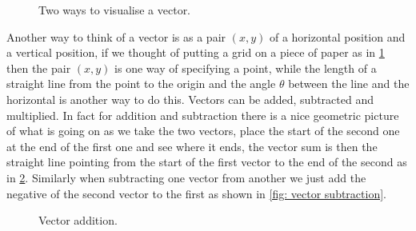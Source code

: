 \documentclass[a4paper,12pt]{book}
\begin{document}
\begin{figure}[ht]
    \centering
    \caption{Two ways to visualise a vector.}
    \label{fig: vectors}
\end{figure}

Another way to think of a vector is as a pair $(x,y)$ of a horizontal position and a vertical position, if we thought of putting a grid on a piece of paper as in \cref{fig: vectors} then the pair $(x,y)$ is one way of specifying a point, while the length of a straight line from the point to the origin and the angle $\theta$ between the line and the horizontal is another way to do this. Vectors can be added, subtracted and multiplied. In fact for addition and subtraction there is a nice geometric picture of what is going on as we take the two vectors, place the start of the second one at the end of the first one and see where it ends, the vector sum is then the straight line pointing from the start of the first vector to the end of the second as in \cref{fig: vector addition}. Similarly when subtracting one vector from another we just add the negative of the second vector to the first as shown in \cref{fig: vector subtraction}.\\

\begin{figure}[ht]
    \centering
    \caption{Vector addition.}
    \label{fig: vector addition}
\end{figure}
\end{document}
